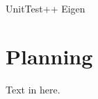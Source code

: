 \documentclass[11pt,fleqn,twoside]{article}
\begin{document}
UnitTest++
Eigen

\section{Planning}
Text in here.



\nocite{*} %

\newpage
{} 

%
%

\renewcommand{\refname}{Annotated Bibliography}  %
\end{document}
